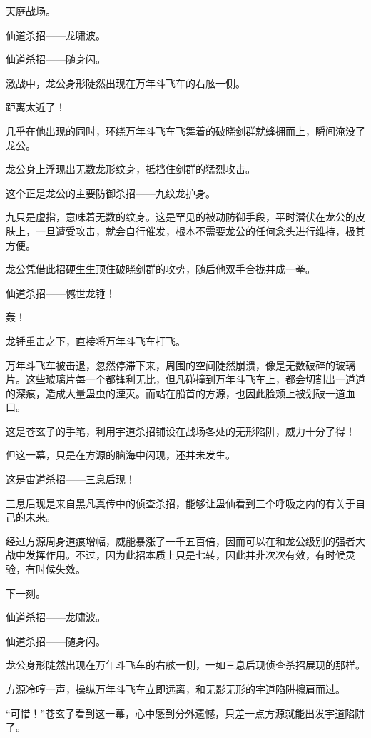 
\begin{this_body}

天庭战场。

仙道杀招——龙啸波。

仙道杀招——随身闪。

激战中，龙公身形陡然出现在万年斗飞车的右舷一侧。

距离太近了！

几乎在他出现的同时，环绕万年斗飞车飞舞着的破晓剑群就蜂拥而上，瞬间淹没了龙公。

龙公身上浮现出无数龙形纹身，抵挡住剑群的猛烈攻击。

这个正是龙公的主要防御杀招——九纹龙护身。

九只是虚指，意味着无数的纹身。这是罕见的被动防御手段，平时潜伏在龙公的皮肤上，一旦遭受攻击，就会自行催发，根本不需要龙公的任何念头进行维持，极其方便。

龙公凭借此招硬生生顶住破晓剑群的攻势，随后他双手合拢并成一拳。

仙道杀招——憾世龙锤！

轰！

龙锤重击之下，直接将万年斗飞车打飞。

万年斗飞车被击退，忽然停滞下来，周围的空间陡然崩溃，像是无数破碎的玻璃片。这些玻璃片每一个都锋利无比，但凡碰撞到万年斗飞车上，都会切割出一道道的深痕，造成大量蛊虫的湮灭。而站在船首的方源，也因此脸颊上被划破一道血口。

这是苍玄子的手笔，利用宇道杀招铺设在战场各处的无形陷阱，威力十分了得！

但这一幕，只是在方源的脑海中闪现，还并未发生。

这是宙道杀招——三息后现！

三息后现是来自黑凡真传中的侦查杀招，能够让蛊仙看到三个呼吸之内的有关于自己的未来。

经过方源周身道痕增幅，威能暴涨了一千五百倍，因而可以在和龙公级别的强者大战中发挥作用。不过，因为此招本质上只是七转，因此并非次次有效，有时候灵验，有时候失效。

下一刻。

仙道杀招——龙啸波。

仙道杀招——随身闪。

龙公身形陡然出现在万年斗飞车的右舷一侧，一如三息后现侦查杀招展现的那样。

方源冷哼一声，操纵万年斗飞车立即远离，和无影无形的宇道陷阱擦肩而过。

“可惜！”苍玄子看到这一幕，心中感到分外遗憾，只差一点方源就能出发宇道陷阱了。


\end{this_body}
